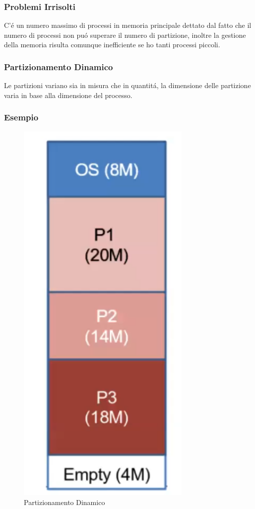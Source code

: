     \subsubsection*{Problemi Irrisolti}
    C'é un numero massimo di processi in memoria principale dettato dal fatto che il numero di processi non puó superare
    il numero di partizione, inoltre la gestione della memoria risulta comunque inefficiente se ho tanti processi piccoli.
    \subsubsection{Partizionamento Dinamico}
    Le partizioni variano sia in misura che in quantitá, la dimensione delle partizione varia in base alla dimensione 
    del processo.
    \subsubsection*{Esempio}
    \begin{figure}
        \centering
        \includegraphics[width=0.75\textwidth]{immagini/EsempioPartizionamentoDinamico}
        \caption{Partizionamento Dinamico}
    \end{figure}
